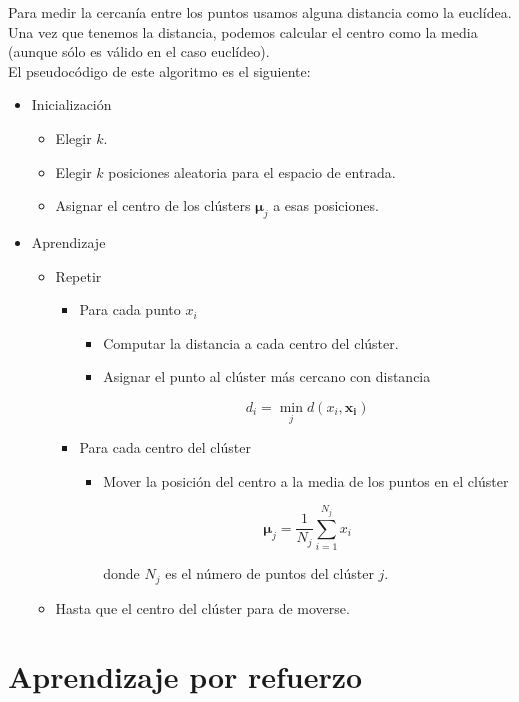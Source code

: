 Para medir la cercanía entre los puntos usamos alguna distancia como la euclídea. Una vez que tenemos la distancia, podemos calcular el centro como la media (aunque sólo es válido en el caso euclídeo).\\

El pseudocódigo de este algoritmo es el siguiente:

\begin{itemize}
\item Inicialización

\begin{itemize}
\item Elegir $k$.
\item Elegir $k$ posiciones aleatoria para el espacio de entrada.
\item Asignar el centro de los clústers $\mathbf{\mu}_j$ a esas posiciones.
\end{itemize}

\item Aprendizaje

\begin{itemize}
\item Repetir

\begin{itemize}
\item Para cada punto $x_i$

\begin{itemize}
\item Computar la distancia a cada centro del clúster.
\item Asignar el punto al clúster más cercano con distancia

\begin{equation}
d_i = \min_j d(x_i, \mathbf{x_i})
\end{equation}
\end{itemize}

\item Para cada centro del clúster

\begin{itemize}
\item Mover la posición del centro a la media de los puntos en el clúster

\begin{equation}
\mathbf{\mu}_j = \dfrac{1}{N_j} \sum_{i=1}^{N_j} x_i
\end{equation}

donde $N_j$ es el número de puntos del clúster $j$.
\end{itemize}

\end{itemize}

\item Hasta que el centro del clúster para de moverse.

\end{itemize}

\end{itemize}  

\section{Aprendizaje por refuerzo}

